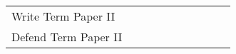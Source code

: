 \begin{table}[!htb]
\begin{tabular}{p{4cm}|l|lllll|lll}
    \rowcolor[rgb]{0.914,0.914,0.914} Write Term Paper II                                                                             &                                      &                                      &                                      &                                      &                                      &                                      &                                      & {\cellcolor[rgb]{0.753,0.753,0.753}} & {\cellcolor[rgb]{0.753,0.753,0.753}} \\
    Defend Term Paper II                                                                                                              &                                      &                                      &                                      &                                      &                                      &                                      &                                      &                                      & {\cellcolor[rgb]{0.753,0.753,0.753}} \\
    \toprule
  \end{tabular}
\end{table}